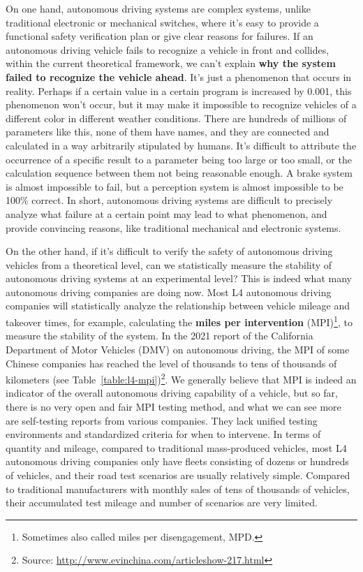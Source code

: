 On one hand, autonomous driving systems are complex systems, unlike traditional electronic or mechanical switches, where it's easy to provide a functional safety verification plan or give clear reasons for failures. If an autonomous driving vehicle fails to recognize a vehicle in front and collides, within the current theoretical framework, we can't explain \textbf{why the system failed to recognize the vehicle ahead}. It's just a phenomenon that occurs in reality. Perhaps if a certain value in a certain program is increased by 0.001, this phenomenon won't occur, but it may make it impossible to recognize vehicles of a different color in different weather conditions. There are hundreds of millions of parameters like this, none of them have names, and they are connected and calculated in a way arbitrarily stipulated by humans. It's difficult to attribute the occurrence of a specific result to a parameter being too large or too small, or the calculation sequence between them not being reasonable enough. A brake system is almost impossible to fail, but a perception system is almost impossible to be 100\% correct. In short, autonomous driving systems are difficult to precisely analyze what failure at a certain point may lead to what phenomenon, and provide convincing reasons, like traditional mechanical and electronic systems.

On the other hand, if it's difficult to verify the safety of autonomous driving vehicles from a theoretical level, can we statistically measure the stability of autonomous driving systems at an experimental level? This is indeed what many autonomous driving companies are doing now. Most L4 autonomous driving companies will statistically analyze the relationship between vehicle mileage and takeover times, for example, calculating the \textbf{miles per intervention} (MPI)\footnote{Sometimes also called miles per disengagement, MPD.}, to measure the stability of the system. In the 2021 report of the California Department of Motor Vehicles (DMV) on autonomous driving, the MPI of some Chinese companies has reached the level of thousands to tens of thousands of kilometers (see Table~\ref{table:l4-mpi})\footnote{Source: \url{http://www.evinchina.com/articleshow-217.html}}. We generally believe that MPI is indeed an indicator of the overall autonomous driving capability of a vehicle, but so far, there is no very open and fair MPI testing method, and what we can see more are self-testing reports from various companies. They lack unified testing environments and standardized criteria for when to intervene. In terms of quantity and mileage, compared to traditional mass-produced vehicles, most L4 autonomous driving companies only have fleets consisting of dozens or hundreds of vehicles, and their road test scenarios are usually relatively simple. Compared to traditional manufacturers with monthly sales of tens of thousands of vehicles, their accumulated test mileage and number of scenarios are very limited.

